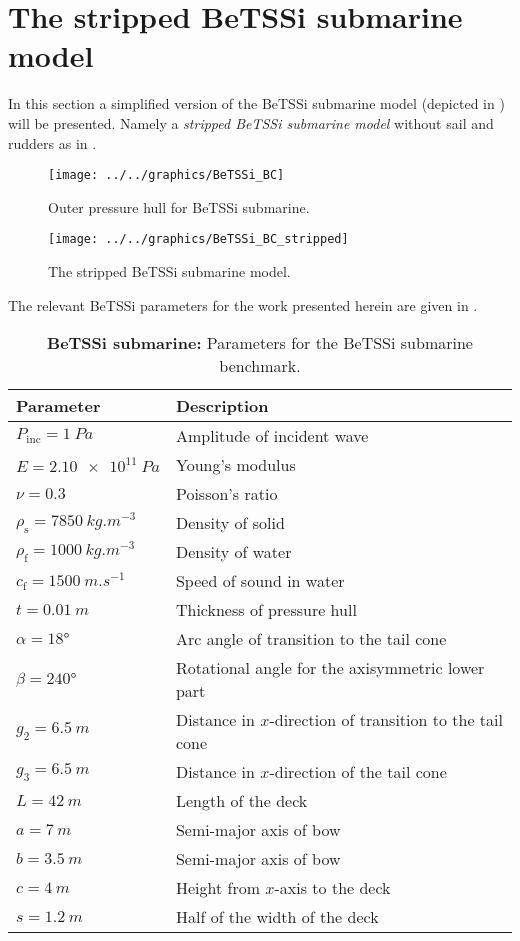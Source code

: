 \section{The stripped BeTSSi submarine model}
\label{Sec2:BeTSSi_description}
In this section a simplified version of the BeTSSi submarine model (depicted in ) will be presented. Namely a \textit{stripped BeTSSi submarine model} without sail and rudders as in .
\begin{figure}
	\centering
	\texttt{[image: ../../graphics/BeTSSi\_BC]}
	\caption{Outer pressure hull for BeTSSi submarine.}
	\label{Fig2:BeTSSi_BC}
\end{figure}
\begin{figure}
	\centering
	\texttt{[image: ../../graphics/BeTSSi\_BC\_stripped]}
	\caption{The stripped BeTSSi submarine model.}
	\label{Fig2:BeTSSi_BC_stripped}
\end{figure}
The relevant BeTSSi parameters for the work presented herein are given in .
\begin{table}
	\centering
	\caption{\textbf{BeTSSi submarine:} Parameters for the BeTSSi submarine benchmark.}
	\label{Tab2:BeTSSiParameters}
	\begin{tabular}{l l}
		\toprule
		Parameter & Description\\
		\midrule
		$P_{\mathrm{inc}}=\SI{1}{Pa}$ & Amplitude of incident wave\\
		$E = \SI{2.10e11}{Pa}$ & Young's modulus\\
		$\nu = 0.3$ & Poisson's ratio\\
		$\rho_{\mathrm{s}} = \SI{7850}{kg.m^{-3}}$ & Density of solid\\
		$\rho_{\mathrm{f}} = \SI{1000}{kg.m^{-3}}$ & Density of water\\
		$c_{\mathrm{f}} = \SI{1500}{m.s^{-1}}$ & Speed of sound in water\\
		$t=\SI{0.01}{m}$ & Thickness of pressure hull\\
		$\alpha=\ang{18}$ & Arc angle of transition to the tail cone\\
		$\beta=\ang{240}$ & Rotational angle for the axisymmetric lower part\\
		$g_2=\SI{6.5}{m}$ & Distance in $x$-direction of transition to the tail cone\\
		$g_3=\SI{6.5}{m}$ & Distance in $x$-direction of the tail cone\\
		$L=\SI{42}{m}$ & Length of the deck\\
		$a=\SI{7}{m}$ & Semi-major axis of bow\\
		$b=\SI{3.5}{m}$ & Semi-major axis of bow\\
		$c=\SI{4}{m}$ & Height from $x$-axis to the deck\\
		$s=\SI{1.2}{m}$ & Half of the width of the deck\\
		\bottomrule
	\end{tabular}
\end{table}
